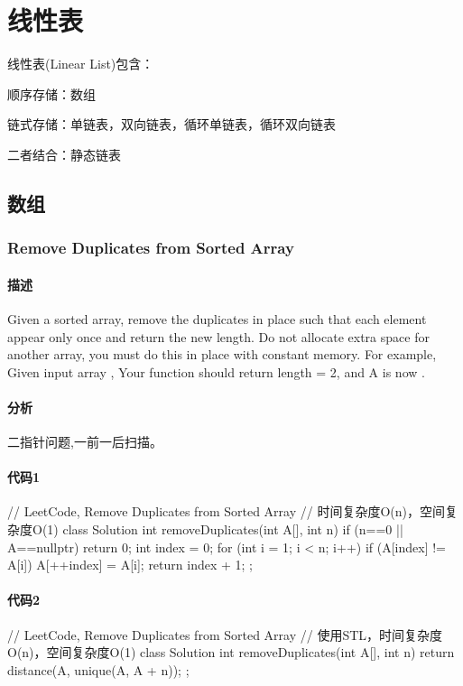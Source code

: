 \chapter{线性表}
线性表(Linear List)包含：
\begindot
\item 顺序存储：数组
\item 链式存储：单链表，双向链表，循环单链表，循环双向链表
\item 二者结合：静态链表
\myenddot

\section{数组} %


\subsection{Remove Duplicates from Sorted Array}
\label{sec:remove-duplicates-from-sorted-array}


\subsubsection{描述}
Given a sorted array, remove the duplicates in place such that each element 
appear only once and return the new length.
Do not allocate extra space for another array, you must do this in place with 
constant memory.
For example, Given input array ,
Your function should return length = 2, and A is now \code{[1,2]}.

\subsubsection{分析}
二指针问题,一前一后扫描。

\subsubsection{代码1}
\begin{Code}
	// LeetCode, Remove Duplicates from Sorted Array
	// 时间复杂度O(n)，空间复杂度O(1)
	class Solution {
		int removeDuplicates(int A[], int n) {
			if (n==0 || A==nullptr) return 0;
			int index = 0;
			for (int i = 1; i < n; i++) {
				if (A[index] != A[i])
					A[++index] = A[i];
			}
			return index + 1;
		}
	};
\end{Code}
\subsubsection{代码2}
\begin{Code}
	// LeetCode, Remove Duplicates from Sorted Array
	// 使用STL，时间复杂度O(n)，空间复杂度O(1)
	class Solution {
		int removeDuplicates(int A[], int n) {
			return distance(A, unique(A, A + n));
		}
	};
\end{Code}
